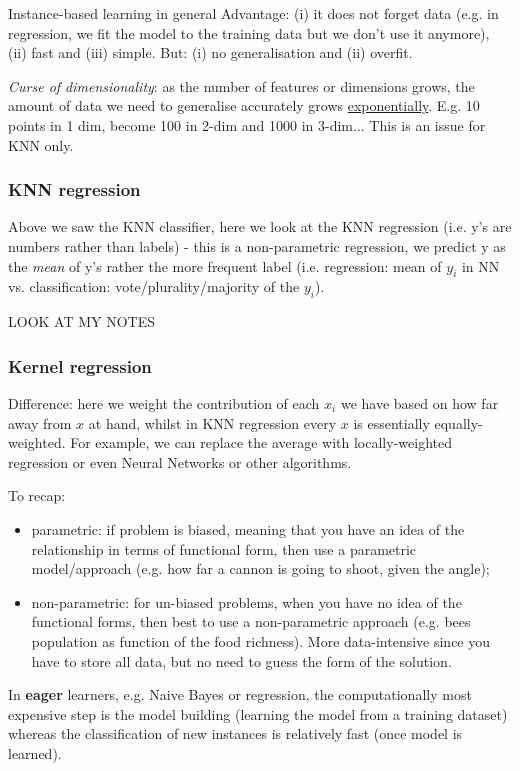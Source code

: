 \documentclass[11pt]{article}
\begin{document}
Instance-based learning in general
Advantage: (i) it does not forget data (e.g. in regression, we fit the model to the training data but we don't use it anymore), (ii) fast and (iii) simple. But: (i) no generalisation and (ii) overfit.

\textit{Curse of dimensionality}: as the number of features or dimensions grows, the amount of data we need to generalise accurately grows \underline{exponentially}. E.g. 10 points in 1 dim, become 100 in 2-dim and 1000 in 3-dim... This is an issue for KNN only.

\subsubsection{KNN regression}
Above we saw the KNN classifier, here we look at the KNN regression (i.e. y's are numbers rather than labels) - this is a non-parametric regression, we predict y as the \textit{mean} of y's rather the more frequent label (i.e. regression: mean of $y_i$ in NN vs. classification: vote/plurality/majority of the $y_i$).

LOOK AT MY NOTES

\subsubsection{Kernel regression}
Difference: here we weight the contribution of each $x_i$ we have based on how far away from $x$ at hand, whilst in KNN regression every $x$ is essentially equally-weighted. For example, we can replace the average with locally-weighted regression or even Neural Networks or other algorithms.

To recap:
\begin{itemize}
	\item parametric: if problem is biased, meaning that you have an idea of the relationship in terms of functional form, then use a parametric model/approach (e.g. how far a cannon is going to shoot, given the angle);
	\item non-parametric: for un-biased problems, when you have no idea of the functional forms, then best to use a non-parametric approach (e.g. bees population as function of the food richness). More data-intensive since you have to store all data, but no need to guess the form of the solution.
\end{itemize}


In \textbf{eager} learners, e.g. Naive Bayes or regression, the computationally most expensive step is the model building (learning the model from a training dataset) whereas the classification of new instances is relatively fast (once model is learned).
\end{document}
